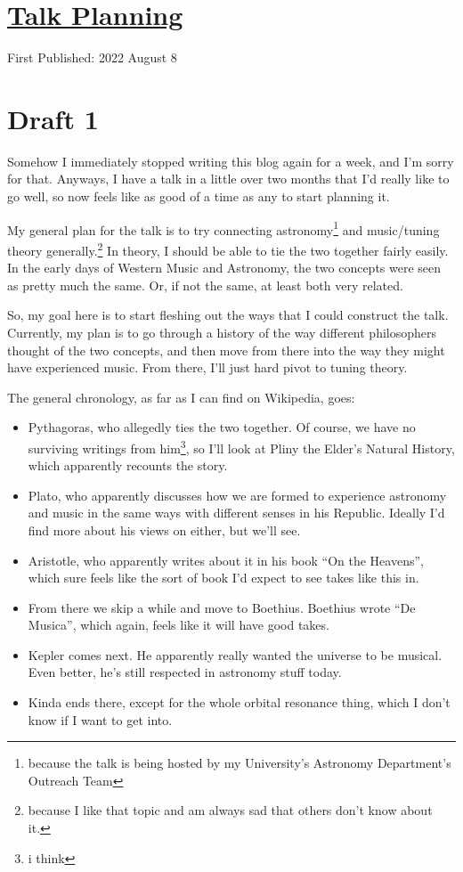 \documentclass[12pt]{article}[titlepage]
\newcommand{\say}[1]{``#1''}
\newcommand{\1}{\={a}}
\newcommand{\2}{\={e}}
\newcommand{\3}{\={\i}}
\newcommand{\4}{\=o}
\newcommand{\5}{\=u}
\newcommand{\6}{\={A}}
\renewcommand{\,}{\textsuperscript{,}}
\begin{document}
\doublespacing
\section{\href{talk-planning-1.tex}{Talk Planning}}
First Published: 2022 August 8
\section{Draft 1}
Somehow I immediately stopped writing this blog again for a week, and I'm sorry for that.
Anyways, I have a talk in a little over two months that I'd really like to go well, so now feels like as good of a time as any to start planning it.

My general plan for the talk is to try connecting astronomy\footnote{because the talk is being hosted by my University's Astronomy Department's Outreach Team} and music/tuning theory generally.\footnote{because I like that topic and am always sad that others don't know about it.}
In theory, I should be able to tie the two together fairly easily.
In the early days of Western Music and Astronomy, the two concepts were seen as pretty much the same.
Or, if not the same, at least both very related.

So, my goal here is to start fleshing out the ways that I could construct the talk.
Currently, my plan is to go through a history of the way different philosophers thought of the two concepts, and then move from there into the way they might have experienced music.
From there, I'll just hard pivot to tuning theory.

The general chronology, as far as I can find on Wikipedia, goes:
\begin{itemize}
\item Pythagoras, who allegedly ties the two together. Of course, we have no surviving writings from him\footnote{i think}, so I'll look at Pliny the Elder's Natural History, which apparently recounts the story.
\item Plato, who apparently discusses how we are formed to experience astronomy and music in the same ways with different senses in his Republic. Ideally I'd find more about his views on either, but we'll see.
\item Aristotle, who apparently writes about it in his book \say{On the Heavens}, which sure feels like the sort of book I'd expect to see takes like this in.
\item From there we skip a while and move to Boethius. Boethius wrote \say{De Musica}, which again, feels like it will have good takes.
\item Kepler comes next. He apparently really wanted the universe to be musical. Even better, he's still respected in astronomy stuff today.
\item Kinda ends there, except for the whole orbital resonance thing, which I don't know if I want to get into.
\end{itemize}
\end{document}
